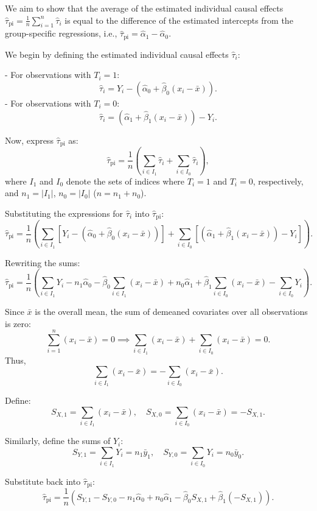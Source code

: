 \documentclass{article}
\begin{document}
We aim to show that the average of the estimated individual causal effects \(\hat{\tau}_{\text{pi}} = \frac{1}{n} \sum_{i=1}^{n} \hat{\tau}_i\) is equal to the difference of the estimated intercepts from the group-specific regressions, i.e., \(\hat{\tau}_{\text{pi}} = \hat{\alpha}_1 - \hat{\alpha}_0\).

We begin by defining the estimated individual causal effects \(\hat{\tau}_i\):

- For observations with \(T_i = 1\):
  \[
  \hat{\tau}_i = Y_i - \left( \hat{\alpha}_0 + \hat{\beta}_0 (x_i - \bar{x}) \right).
  \]
- For observations with \(T_i = 0\):
  \[
  \hat{\tau}_i = \left( \hat{\alpha}_1 + \hat{\beta}_1 (x_i - \bar{x}) \right) - Y_i.
  \]

Now, express \(\hat{\tau}_{\text{pi}}\) as:
\[
\hat{\tau}_{\text{pi}} = \frac{1}{n} \left( \sum_{i \in I_1} \hat{\tau}_i + \sum_{i \in I_0} \hat{\tau}_i \right),
\]
where \(I_1\) and \(I_0\) denote the sets of indices where \(T_i = 1\) and \(T_i = 0\), respectively, and \(n_1 = |I_1|\), \(n_0 = |I_0|\) (\(n = n_1 + n_0\)).

Substituting the expressions for \(\hat{\tau}_i\) into \(\hat{\tau}_{\text{pi}}\):
\[
\hat{\tau}_{\text{pi}} = \frac{1}{n} \left( \sum_{i \in I_1} \left[ Y_i - \left( \hat{\alpha}_0 + \hat{\beta}_0 (x_i - \bar{x}) \right) \right] + \sum_{i \in I_0} \left[ \left( \hat{\alpha}_1 + \hat{\beta}_1 (x_i - \bar{x}) \right) - Y_i \right] \right).
\]

Rewriting the sums:
\[
\hat{\tau}_{\text{pi}} = \frac{1}{n} \left( \sum_{i \in I_1} Y_i - n_1 \hat{\alpha}_0 - \hat{\beta}_0 \sum_{i \in I_1} (x_i - \bar{x}) + n_0 \hat{\alpha}_1 + \hat{\beta}_1 \sum_{i \in I_0} (x_i - \bar{x}) - \sum_{i \in I_0} Y_i \right).
\]

Since \(\bar{x}\) is the overall mean, the sum of demeaned covariates over all observations is zero:
\[
\sum_{i=1}^{n} (x_i - \bar{x}) = 0 \implies \sum_{i \in I_1} (x_i - \bar{x}) + \sum_{i \in I_0} (x_i - \bar{x}) = 0.
\]
Thus,
\[
\sum_{i \in I_1} (x_i - \bar{x}) = - \sum_{i \in I_0} (x_i - \bar{x}).
\]

Define:
\[
S_{X,1} = \sum_{i \in I_1} (x_i - \bar{x}), \quad S_{X,0} = \sum_{i \in I_0} (x_i - \bar{x}) = - S_{X,1}.
\]

Similarly, define the sums of \(Y_i\):
\[
S_{Y,1} = \sum_{i \in I_1} Y_i = n_1 \bar{y}_1, \quad S_{Y,0} = \sum_{i \in I_0} Y_i = n_0 \bar{y}_0.
\]

Substitute back into \(\hat{\tau}_{\text{pi}}\):
\[
\hat{\tau}_{\text{pi}} = \frac{1}{n} \left( S_{Y,1} - S_{Y,0} - n_1 \hat{\alpha}_0 + n_0 \hat{\alpha}_1 - \hat{\beta}_0 S_{X,1} + \hat{\beta}_1 (- S_{X,1}) \right).
\]
\end{document}
